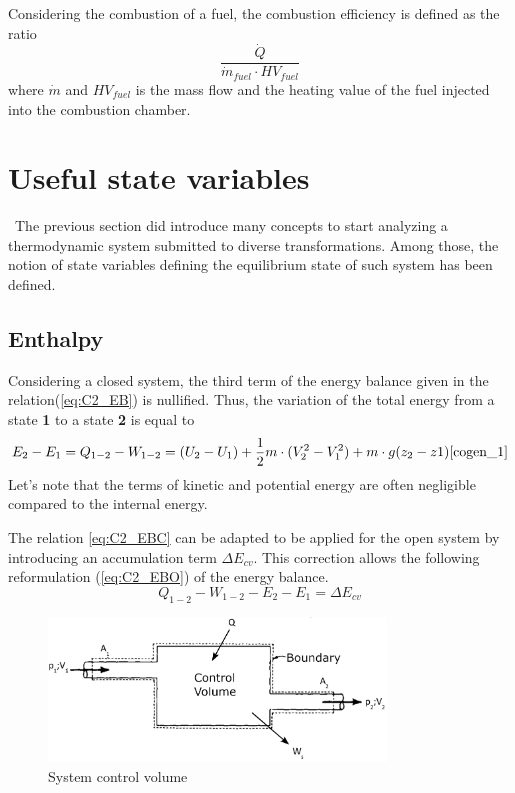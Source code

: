 Considering the combustion of a fuel, the combustion efficiency is defined as the ratio
$$ \frac{\dot{Q}}{\dot{m}_{fuel}\cdot HV_{fuel}}$$
where $\dot{m}$  and $HV_{fuel}$ is the mass flow and the heating value of the fuel injected into the combustion chamber.
\section{Useful state variables}
\quad\, The previous section did introduce many concepts to start analyzing a thermodynamic system submitted to diverse transformations. Among those, the notion of state variables defining the equilibrium state of such system has been defined.   
\subsection{Enthalpy}
Considering a closed system, the third term of the energy balance given in the relation(\ref{eq:C2_EB}) is nullified. Thus, the variation of the total energy from a state \textbf{1} to a state \textbf{2} is equal to
\begin{equation}
E_{2} - E_{1} = Q_{1-2} - W_{1-2} = (U_2 - U_1) + \frac{1}{2}m\cdot(V^2_2 - V^2_1) + m\cdot g(z_2 - z1)\cite{cogen_1} \label{eq:C2_EBC}
\end{equation}
Let's note that the terms of kinetic and potential energy are often negligible compared to the internal energy.  

The relation \ref{eq:C2_EBC} can be adapted to be applied for the open system by introducing an accumulation term $\Delta E_{cv}$. This correction allows the following reformulation (\ref{eq:C2_EBO}) of the energy balance.
\begin{equation}
Q_{1-2} - W_{1-2} - E_{2} - E_{1} = \Delta E_{cv}\label{eq:C2_EBO}
\end{equation}

\begin{figure}[h]
\centering
\includegraphics[width=0.8\textwidth]{control_volume.png}
\caption{System control volume}
\label{fig:C2_VC}
\end{figure}

